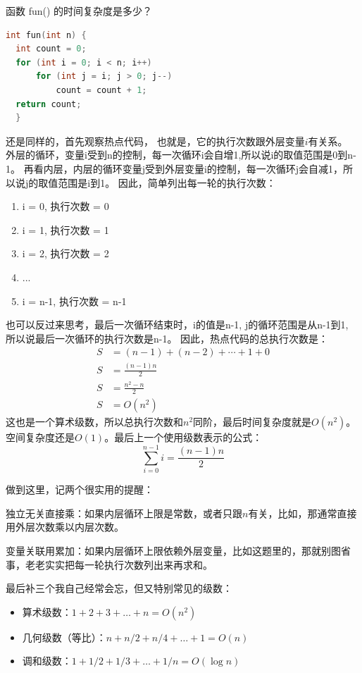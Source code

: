 \documentclass[b5paper,11pt]{article}
\begin{document}
\begin{question}
  函数 fun() 的时间复杂度是多少？
\begin{lstlisting}[language=C]
  int fun(int n) {
  int count = 0;
  for (int i = 0; i < n; i++)
      for (int j = i; j > 0; j--)
          count = count + 1;
  return count;
  }
\end{lstlisting}
\end{question}

\begin{solution}
  还是同样的，首先观察热点代码， 也就是，它的执行次数跟外层变量$i$有关系。
  外层的循环，变量i受到n的控制，每一次循环i会自增1,所以说i的取值范围是0到n-1。
  再看内层，内层的循环变量j受到外层变量i的控制，每一次循环j会自减1，所以说j的取值范围是i到1。
  因此，简单列出每一轮的执行次数：
  \begin{enumerate}
    \item i = 0, 执行次数 = 0
    \item i = 1, 执行次数 = 1
    \item i = 2, 执行次数 = 2
    \item ...
    \item i = n-1, 执行次数 = n-1
  \end{enumerate}
  也可以反过来思考，最后一次循环结束时，i的值是n-1, j的循环范围是从n-1到1, 所以说最后一次循环的执行次数是n-1。
  因此，热点代码的总执行次数是：
  \begin{equation*}
    \begin{aligned}
      S &= (n-1) + (n-2) + \cdots + 1 + 0 \\
      S &= \frac{(n-1)n}{2} \\
      S &= \frac{n^2 - n}{2} \\
      S &= O(n^2)
    \end{aligned}
  \end{equation*}
  这也是一个算术级数，所以总执行次数和$n^2$同阶，最后时间复杂度就是$O(n^2)$。空间复杂度还是$O(1)$。最后上一个使用级数表示的公式：
  $$\sum_{i=0}^{n-1} i = \frac{(n-1)n}{2}$$
\end{solution}

\vspace{2.0em}

做到这里，记两个很实用的提醒：

独立无关直接乘：如果内层循环上限是常数，或者只跟$n$有关，比如，那通常直接用外层次数乘以内层次数。

变量关联用累加：如果内层循环上限依赖外层变量，比如这题里的，那就别图省事，老老实实把每一轮执行次数列出来再求和。

最后补三个我自己经常会忘，但又特别常见的级数：
\begin{itemize}
  \item 算术级数：$1 + 2 + 3 + \dots + n = O(n^2)$
  \item 几何级数（等比）：$n + n/2 + n/4 + \dots + 1 = O(n)$
  \item 调和级数：$1 + 1/2 + 1/3 + \dots + 1/n = O(\log n)$
\end{itemize}
\end{document}
